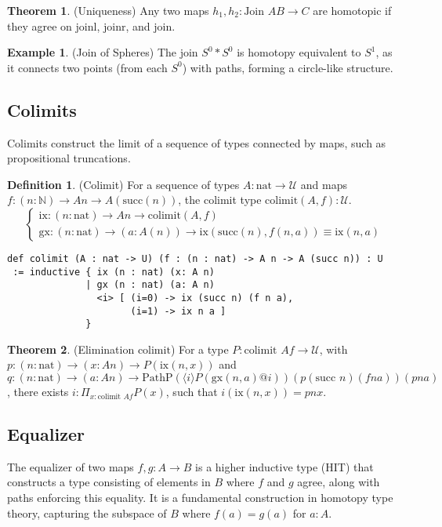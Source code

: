 \documentclass{article}
\theoremstyle{definition}
\newtheorem{theorem}{Theorem}
\newtheorem{definition}{Definition}
\newtheorem{example}{Example}
\begin{document}
\begin{theorem} (Uniqueness)
Any two maps $h_1, h_2 : \text{Join } A B \to C$ are homotopic
if they agree on $\text{joinl}$, $\text{joinr}$, and $\text{join}$.
\end{theorem}

\begin{example} (Join of Spheres)
The join $S^0 * S^0$ is homotopy equivalent to $S^1$, as it connects
two points (from each $S^0$) with paths, forming a circle-like structure.
\end{example}


\newpage

\subsection{Colimits}
Colimits construct the limit of a sequence of types connected by maps,
such as propositional truncations.

\begin{definition} (Colimit)
For a sequence of types $A : \text{nat} \to \mathcal{U}$ and
maps $f : (n : \mathbb{N}) \to A n \to A(\text{succ}(n))$,
the colimit type $\text{colimit}(A,f) : \mathcal{U}$.
\[
\begin{cases}
\text{ix} : (n : \text{nat}) \to A n \to \text{colimit}(A,f) \\
\text{gx} : (n : \text{nat}) \to (a : A(n)) \to \text{ix} (\text{succ}(n),f(n,a)) \equiv \text{ix}(n,a)
\end{cases}
\]
\begin{lstlisting}
def colimit (A : nat -> U) (f : (n : nat) -> A n -> A (succ n)) : U
 := inductive { ix (n : nat) (x: A n)
              | gx (n : nat) (a: A n)
                <i> [ (i=0) -> ix (succ n) (f n a),
                      (i=1) -> ix n a ]
              }
\end{lstlisting}
\end{definition}

\begin{theorem} (Elimination $\text{colimit}$)
For a type $P : \text{colimit } A f \to \mathcal{U}$,
with $p : (n : \text{nat}) \to (x : A n) \to P(\text{ix}(n, x))$
and $q : (n : \text{nat}) \to (a : A n) \to \text{PathP} (\langle i \rangle P(\text{gx}(n, a) @ i)) (p (\text{succ } n) (f n a)) (p n a)$,
there exists $i : \Pi_{x:\text{colimit } A f} P(x)$, such that $i(\text{ix}(n, x)) = p n x$.
\end{theorem}

\newpage

\subsection{Equalizer}
The equalizer of two maps $f, g : A \to B$ is a higher inductive
type (HIT) that constructs a type consisting of elements in $B$
where $f$ and $g$ agree, along with paths enforcing this equality.
It is a fundamental construction in homotopy type theory,
capturing the subspace of $B$ where $f(a) = g(a)$ for $a : A$.
\end{document}
